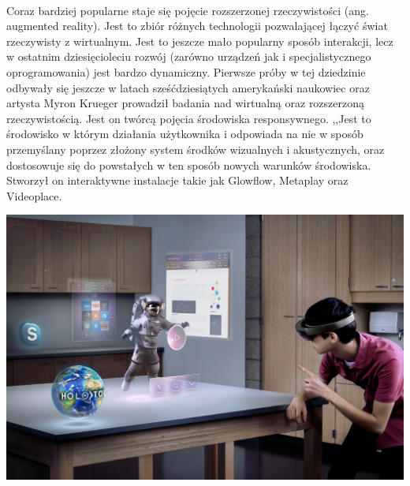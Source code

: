 \paragraph{}
Coraz bardziej popularne staje się pojęcie rozszerzonej rzeczywistości (ang. augmented reality). Jest to zbiór różnych technologii pozwalającej łączyć świat rzeczywisty z wirtualnym. Jest to jeszcze mało popularny sposób interakcji, lecz w ostatnim dziesięcioleciu rozwój (zarówno urządzeń jak i specjalistycznego oprogramowania) jest bardzo dynamiczny.
\newline
Pierwsze próby w tej dziedzinie odbywały się jeszcze w latach sześćdziesiątych amerykański naukowiec oraz artysta Myron Krueger prowadził badania nad wirtualną oraz rozszerzoną rzeczywistością. Jest on twórcą pojęcia środowiska responsywnego. ,,Jest to środowisko w którym działania użytkownika i odpowiada na nie w sposób przemyślany poprzez złożony system środków wizualnych i akustycznych, oraz dostosowuje się do powstałych w ten sposób nowych warunków środowiska\cite{kr}. Stworzył on interaktywne instalacje takie jak Glowflow\cite{glow}, Metaplay\cite{metaplay} oraz Videoplace\cite{videoplace}.
\begin{center}
\newpage
\includegraphics[width=1\textwidth]{images/hololens.png}
\end{center}
